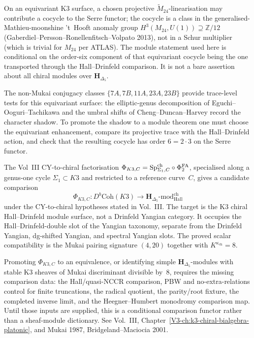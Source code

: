 \begin{remark}
\label{rem:chiralmod-2}
On an equivariant K3 surface, a chosen projective
$\widetilde M_{24}$-linearisation may contribute a cocycle to the
Serre functor; the cocycle is a class in the generalised-Mathieu-moonshine
't~Hooft anomaly group $H^3(M_{24}, U(1)) \supseteq \mathbb Z/12$
(Gaberdiel--Persson--Ronellenfitsch--Volpato 2013), not in a Schur multiplier
(which is trivial for $M_{24}$ per ATLAS). The module statement used here is
conditional on the order-six component of that equivariant cocycle being the
one transported through the Hall--Drinfeld comparison. It is not a bare
assertion about all chiral modules over $\mathbf H_{\Delta_5}$.

The non-Mukai conjugacy classes
$\{7A,7B,11A,23A,23B\}$ provide trace-level tests for this equivariant
surface: the elliptic-genus decomposition of Eguchi--Ooguri--Tachikawa
and the umbral shifts of Cheng--Duncan--Harvey record the character
shadow. To promote the shadow to a module theorem one must choose the
equivariant enhancement, compare its projective trace with the
Hall--Drinfeld action, and check that the resulting cocycle has order
$6=2\cdot3$ on the Serre functor.
\end{remark}

\begin{remark}
\label{rem:chiralmod-3}
The Vol~III CY-to-chiral factorisation
$\Phi_{K3,C}=\mathrm{Sp}^{\mathrm{ch}}_{\Sigma_1,C}\circ\Phi^{\mathrm{FA}}_2$, specialised along a
genus-one cycle $\Sigma_1\subset K3$ and restricted to a reference
curve~$C$, gives a candidate comparison
\[
\Phi_{K3,C}\colon
D^b\mathrm{Coh}(K3)
\longrightarrow
\mathbf H_{\Delta_5}\text{-}\mathrm{mod}^{\mathrm{ch}}_{\mathrm{Hall}}
\]
under the CY-to-chiral hypotheses stated in Vol.~III. The target is the
K3 chiral Hall--Drinfeld module surface, not a Drinfeld Yangian
category. It occupies the Hall--Drinfeld-double slot of the Yangian
taxonomy, separate from the Drinfeld Yangian, dg-shifted Yangian, and
spectral Yangian slots. The proved scalar compatibility is the Mukai
pairing signature $(4,20)$ together with
$K^{\kappa_{\mathrm{ch}}}=8$.

Promoting $\Phi_{K3,C}$ to an equivalence, or identifying simple
$\mathbf H_{\Delta_5}$-modules with stable K3 sheaves of Mukai
discriminant divisible by~$8$, requires the missing comparison data:
the Hall/quasi-NCCR comparison, PBW and no-extra-relations control for
finite truncations, the radical quotient, the parity/root fixture, the
completed inverse limit, and the Heegner--Humbert monodromy comparison
map. Until those inputs are supplied, this is a conditional comparison
functor rather than a sheaf-module dictionary.
See Vol.~III, Chapter~\ref{V3-ch:k3-chiral-bialgebra-platonic}, and
Mukai 1987, Bridgeland--Maciocia 2001.
\end{remark}
